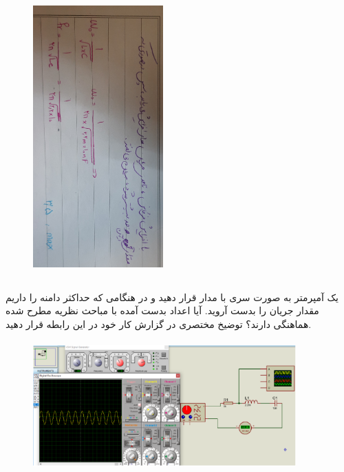 \documentclass[12pt]{article}
\begin{document}
\begin{figure}[H]
\begin{center}
\includegraphics[width=5cm, height=0.9\textwidth, angle=90]{./images/6.1.aa}
\end{center}
\end{figure}

\clearpage
\subsection{}
یک آمپرمتر به صورت سری با مدار قرار دهید و در هنگامی که حداکثر دامنه را داریم مقدار جریان را بدست آروید. آیا اعداد بدست آمده با مباحث نظریه مطرح شده هماهنگی دارند؟ توضیخ مختصری در گزارش کار خود در این رابطه قرار دهید.

\begin{figure}[H]
\begin{center}
\includegraphics[width=0.9\textwidth, height=5cm]{./images/6.2.a}
\end{center}
\end{figure}
\end{document}
